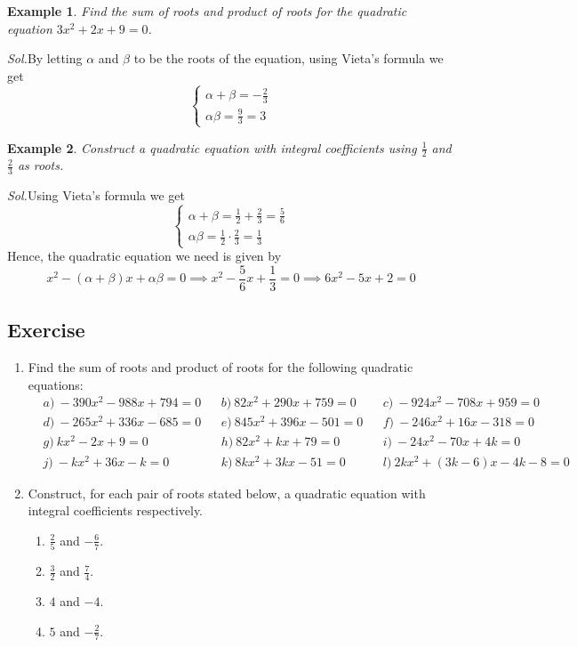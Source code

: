 \documentclass[12pt]{article}
\newtheorem{example}{Example}
\begin{document}
    \begin{example}
        Find the sum of roots and product of roots for the quadratic equation $3x^2+2x+9=0$.
    \end{example}

    \textit{ Sol.}By letting $\alpha$ and $\beta$ to be the roots of the equation, using Vieta's formula we get $$\begin{cases}
        \alpha+\beta=-\frac{2}{3}\\ 
        \alpha\beta=\frac{9}{3}=3
    \end{cases}$$

    \begin{example}
        Construct a quadratic equation with integral coefficients using $\frac{1}{2}$ and $\frac{2}{3}$ as roots.
    \end{example}

    \textit{ Sol.}Using Vieta's formula we get $$\begin{cases}
        \alpha+\beta=\frac{1}{2}+\frac{2}{3}=\frac{5}{6}\\ 
        \alpha\beta=\frac{1}{2}\cdot \frac{2}{3}=\frac{1}{3}
    \end{cases}$$
    \indent \indent Hence, the quadratic equation we need is given by $$x^2-(\alpha+\beta)x+\alpha\beta=0 \implies x^2-\frac{5}{6}x+\frac{1}{3}=0 \implies 6x^2-5x+2=0$$

    \subsection*{Exercise}
    \begin{enumerate}
        \item Find the sum of roots and product of roots for the following quadratic equations:\begin{align*}
            &a)\ -390x^2-988x+794=0&&b)\ 82x^2+290x+759=0&&c)\ -924x^2-708x+959=0\\
            &d)\ -265x^2+336x-685=0&&e)\ 845x^2+396x-501=0&&f)\ -246x^2+16x-318=0\\
            &g)\ kx^2-2x+9=0&&h)\ 82x^2+kx+79=0&&i)\ -24x^2-70x+4k=0\\
            &j)\ -kx^2+36x-k=0&&k)\ 8kx^2+3kx-51=0&&l)\ 2kx^2+(3k-6)x-4k-8=0
        \end{align*}
        \item Construct, for each pair of roots stated below, a quadratic equation with integral coefficients respectively.\begin{enumerate}
            \item $\frac{2}{5}$ and $-\frac{6}{7}$.
            \item $\frac{3}{2}$ and $\frac{7}{4}$.
            \item $4$ and $-4$.
            \item $5$ and $-\frac{2}{7}$.
        \end{enumerate}
    \end{enumerate}
\end{document}
